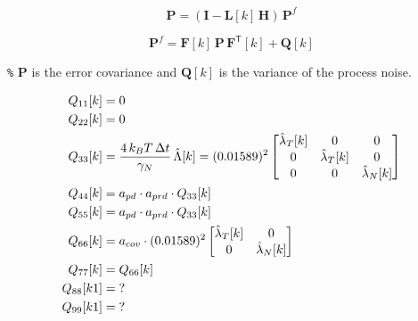 \documentclass[UTF8,11pt,a4paper]{ctexart}
\newcommand{\tp}{^{\!\mathsf{T}}}
\newcommand{\gN}{\gamma_N}
\newcommand{\dt}{\Delta t}
\begin{document}
\[
\mathbf{P} = (\mathbf{I} - \mathbf{L}[k]\,\mathbf{H})\,\mathbf{P}^f
\]

\[
\mathbf{P}^f = \mathbf{F}[k]\,\mathbf{P}\,\mathbf{F}\tp[k] + \mathbf{Q}[k]
\]

\noindent\texttt{\%} $\mathbf{P}$ is the error covariance and $\mathbf{Q}[k]$ is the variance of the process noise.

\begin{align}
Q_{11}[k] &= 0 \notag\\
Q_{22}[k] &= 0 \notag\\
Q_{33}[k] &= \frac{4\,k_B T\,\dt}{\gN}\,\hat{\Lambda}[k]
= (0.01589)^2
\begin{bmatrix}\hat{\lambda}_{T}[k]&0&0\\0&\hat{\lambda}_{T}[k]&0\\0&0&\hat{\lambda}_{N}[k]\end{bmatrix} \notag\\
Q_{44}[k] &= a_{pd}\cdot a_{prd}\cdot Q_{33}[k] \notag\\
Q_{55}[k] &= a_{pd}\cdot a_{prd}\cdot Q_{33}[k] \notag\\
Q_{66}[k] &= a_{cov}\cdot(0.01589)^2
\begin{bmatrix}\hat{\lambda}_{T}[k]&0\\0&\hat{\lambda}_{N}[k]\end{bmatrix} \notag\\
Q_{77}[k] &= Q_{66}[k] \notag\\
Q_{88}[k1] &= \;? \notag\\
Q_{99}[k1] &= \;? \notag
\end{align}
\end{document}
